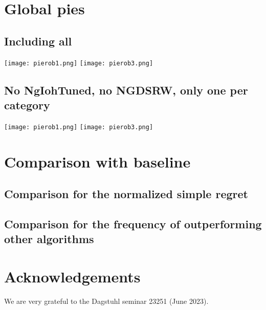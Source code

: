 

\section{Global pies}

\subsection{Including all}
\texttt{[image: pierob1.png]}
\texttt{[image: pierob3.png]}
\subsection{No NgIohTuned, no NGDSRW, only one per category}
\texttt{[image: pierob1.png]}
\texttt{[image: pierob3.png]}


\section{Comparison with baseline}
\subsection{Comparison for the normalized simple regret}

\subsection{Comparison for the frequency of outperforming other algorithms}


\section*{Acknowledgements}
We are very grateful to the Dagstuhl seminar 23251 (June 2023).%




